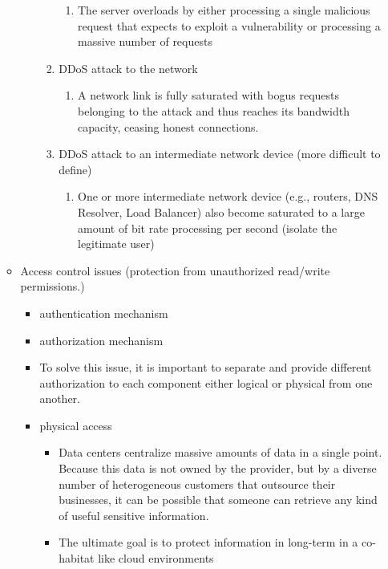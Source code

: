 \documentclass{article}
\begin{document}
\begin{itemize}
\begin{itemize}
\begin{itemize}
\begin{enumerate}
\begin{enumerate}
                    \item The server overloads by either processing a single malicious request that expects to exploit a vulnerability or processing a massive number of requests
                \end{enumerate}
                \item DDoS attack to the network
                \begin{enumerate}
                    \item A network link is fully saturated with bogus requests belonging to the attack and thus reaches its bandwidth capacity, ceasing honest connections.
                \end{enumerate}
                \item DDoS attack to an intermediate network device (more difficult to define)
                \begin{enumerate}
                    \item One or more intermediate network device (e.g., routers, DNS Resolver, Load Balancer) also become saturated to a large amount of bit rate processing per second (isolate the legitimate user)
                \end{enumerate}
            \end{enumerate}
        \end{itemize}
        \item Access control issues (protection from unauthorized read/write permissions.)
        \begin{itemize}
            \item authentication mechanism
            \item authorization mechanism
            \item To solve this issue, it is important to separate and provide different authorization to each component either logical or physical from one another. 
            \item physical access 
            \begin{itemize}
                \item Data centers centralize massive amounts of data in a single point. Because this data is not owned by the provider, but by a diverse number of heterogeneous customers that outsource their businesses, it can be possible that someone can retrieve any kind of useful sensitive information.
                \item The ultimate goal is to protect information in long-term in a co-habitat like cloud environments

\end{itemize}
\end{itemize}
\end{itemize}
\end{itemize}
\end{document}

